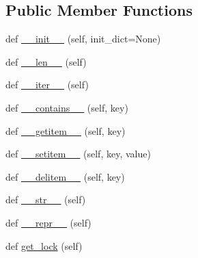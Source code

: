 \subsection*{Public Member Functions}
\begin{DoxyCompactItemize}
\item 
def \hyperlink{classparlai_1_1agents_1_1legacy__agents_1_1seq2seq_1_1utils__v0_1_1SharedTable_a0bb7ef513d5028c6f011cc09c6934dea}{\+\_\+\+\_\+init\+\_\+\+\_\+} (self, init\+\_\+dict=None)
\item 
def \hyperlink{classparlai_1_1agents_1_1legacy__agents_1_1seq2seq_1_1utils__v0_1_1SharedTable_ab4c44b0f04d00aff0f3d2908631a5a24}{\+\_\+\+\_\+len\+\_\+\+\_\+} (self)
\item 
def \hyperlink{classparlai_1_1agents_1_1legacy__agents_1_1seq2seq_1_1utils__v0_1_1SharedTable_a8856d56b13e4d45bc4b6c0097a2579e1}{\+\_\+\+\_\+iter\+\_\+\+\_\+} (self)
\item 
def \hyperlink{classparlai_1_1agents_1_1legacy__agents_1_1seq2seq_1_1utils__v0_1_1SharedTable_ac40e68dfcfa7680874ee1088642e16ff}{\+\_\+\+\_\+contains\+\_\+\+\_\+} (self, key)
\item 
def \hyperlink{classparlai_1_1agents_1_1legacy__agents_1_1seq2seq_1_1utils__v0_1_1SharedTable_a0a5453d4cc84eb034e061f3fc53f7798}{\+\_\+\+\_\+getitem\+\_\+\+\_\+} (self, key)
\item 
def \hyperlink{classparlai_1_1agents_1_1legacy__agents_1_1seq2seq_1_1utils__v0_1_1SharedTable_a03c479f82d23393bb64f53fd2ba70b6d}{\+\_\+\+\_\+setitem\+\_\+\+\_\+} (self, key, value)
\item 
def \hyperlink{classparlai_1_1agents_1_1legacy__agents_1_1seq2seq_1_1utils__v0_1_1SharedTable_a9dec1e7ee1c932cec08159e26cd6b570}{\+\_\+\+\_\+delitem\+\_\+\+\_\+} (self, key)
\item 
def \hyperlink{classparlai_1_1agents_1_1legacy__agents_1_1seq2seq_1_1utils__v0_1_1SharedTable_a678937ad3dcc29e6bda6898c6462950f}{\+\_\+\+\_\+str\+\_\+\+\_\+} (self)
\item 
def \hyperlink{classparlai_1_1agents_1_1legacy__agents_1_1seq2seq_1_1utils__v0_1_1SharedTable_a80d030d79e31bd1754e0efbe65c4d954}{\+\_\+\+\_\+repr\+\_\+\+\_\+} (self)
\item 
def \hyperlink{classparlai_1_1agents_1_1legacy__agents_1_1seq2seq_1_1utils__v0_1_1SharedTable_ad5d29371323182d5d5431300ee6aaba1}{get\+\_\+lock} (self)
\end{DoxyCompactItemize}
